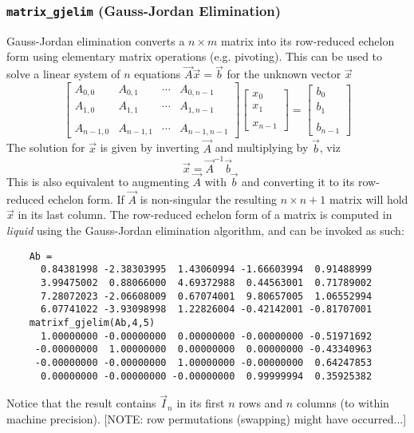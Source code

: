 \subsubsection{{\tt matrix\_gjelim} (Gauss-Jordan Elimination)}
\label{module:matrix:gjelim}
Gauss-Jordan elimination converts a $n \times m$ matrix into its row-reduced
echelon form using elementary matrix operations (e.g. pivoting).
This can be used to solve a linear system of $n$ equations
$\vec{A}\vec{x} = \vec{b}$ for the unknown vector $\vec{x}$
\[
    \begin{bmatrix}
        A_{0,0}     & A_{0,1}   & \cdots  & A_{0,n-1} \\
        A_{1,0}     & A_{1,1}   & \cdots  & A_{1,n-1} \\
        \\
        A_{n-1,0}   & A_{n-1,1} & \cdots  & A_{n-1,n-1}
    \end{bmatrix}
    \begin{bmatrix}
        x_{0} \\
        x_{1} \\
        \\
        x_{n-1}
    \end{bmatrix}
    =
    \begin{bmatrix}
        b_{0} \\
        b_{1} \\
        \\
        b_{n-1}
    \end{bmatrix}
\]
The solution for $\vec{x}$ is given by inverting $\vec{A}$ and multiplying
by $\vec{b}$, viz
\[
    \vec{x} = \vec{A}^{-1}\vec{b}
\]
This is also equivalent to augmenting $\vec{A}$ with $\vec{b}$ and
converting it to its row-reduced echelon form.
If $\vec{A}$ is non-singular the resulting $n \times n+1$ matrix will hold
$\vec{x}$ in its last column.
The row-reduced echelon form of a matrix is computed in {\it liquid} using the
Gauss-Jordan elimination algorithm, and can be invoked as such:
\begin{verbatim}
    Ab =
      0.84381998 -2.38303995  1.43060994 -1.66603994  0.91488999
      3.99475002  0.88066000  4.69372988  0.44563001  0.71789002
      7.28072023 -2.06608009  0.67074001  9.80657005  1.06552994
      6.07741022 -3.93098998  1.22826004 -0.42142001 -0.81707001
    matrixf_gjelim(Ab,4,5)
      1.00000000 -0.00000000  0.00000000 -0.00000000 -0.51971692
     -0.00000000  1.00000000  0.00000000  0.00000000 -0.43340963
     -0.00000000 -0.00000000  1.00000000 -0.00000000  0.64247853
      0.00000000 -0.00000000 -0.00000000  0.99999994  0.35925382
\end{verbatim}
Notice that the result contains $\vec{I}_n$ in its first $n$ rows and $n$
columns (to within machine precision).
[NOTE: row permutations (swapping) might have occurred...]

